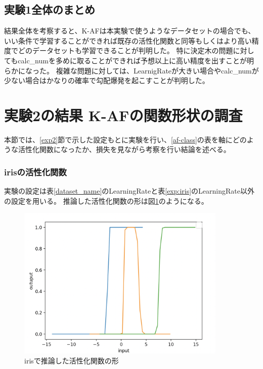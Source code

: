 \subsection{実験1全体のまとめ}
結果全体を考察すると、K-AFは本実験で使うようなデータセットの場合でも、いい条件で学習することができれば既存の活性化関数と同等もしくはより高い精度でどのデータセットも学習できることが判明した。
特に決定木の問題に対してもcalc\_numを多めに取ることができれば予想以上に高い精度を出すことが明らかになった。
複雑な問題に対しては、LearnigRateが大きい場合やcalc\_numが少ない場合はかなりの確率で勾配爆発を起こすことが判明した。


\section{実験2の結果 K-AFの関数形状の調査}
\label{evo2}
本節では、\ref{exp2}節で示した設定もとに実験を行い、\ref{af-class}の表を軸にどのような活性化関数になったか、損失を見ながら考察を行い結論を述べる。





\subsubsection{irisの活性化関数}
実験の設定は表\ref{dataset_name}のLearningRateと表\ref{exp:iris}のLearningRate以外の設定を用いる。
推論した活性化関数の形は図\ref{infer_iris}のようになる。
\begin{figure}[hbtp]
    \begin{center}
        \includegraphics[width=10cm]{asset/iris-0.1.png}
            \caption{irisで推論した活性化関数の形}
            \label{infer_iris}
    \end{center}
\end{figure}

